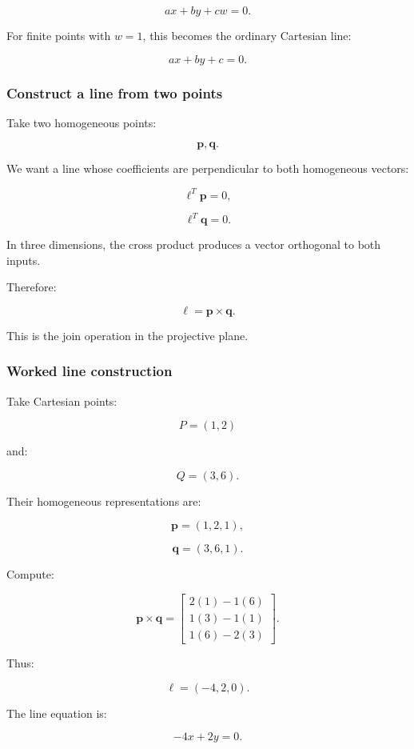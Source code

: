 \[
 \boxed{ ax+by+cw=0 }.
\]

For finite points with \(w=1\), this becomes the ordinary Cartesian line:

\[
 ax+by+c=0.
\]

\subsubsection{Construct a line from two points}\label{construct-a-line-from-two-points}

Take two homogeneous points:

\[
 \mathbf p,\mathbf q.
\]

We want a line whose coefficients are perpendicular to both homogeneous vectors:

\[
 \boldsymbol\ell^T\mathbf p=0,
\]

\[
 \boldsymbol\ell^T\mathbf q=0.
\]

In three dimensions, the cross product produces a vector orthogonal to both inputs.

Therefore:

\[
 \boxed{ \boldsymbol\ell=\mathbf p\times\mathbf q }.
\]

This is the join operation in the projective plane.

\subsubsection{Worked line construction}\label{worked-line-construction}

Take Cartesian points:

\[
 P=(1,2)
\]

and:

\[
 Q=(3,6).
\]

Their homogeneous representations are:

\[
 \mathbf p=(1,2,1),
\]

\[
 \mathbf q=(3,6,1).
\]

Compute:

\[
 \mathbf p\times\mathbf q= \begin{bmatrix} 2(1)-1(6)\\ 1(3)-1(1)\\ 1(6)-2(3) \end{bmatrix}.
\]

Thus:

\[
 \boxed{ \boldsymbol\ell=(-4,2,0) }.
\]

The line equation is:

\[
 -4x+2y=0.
\]


